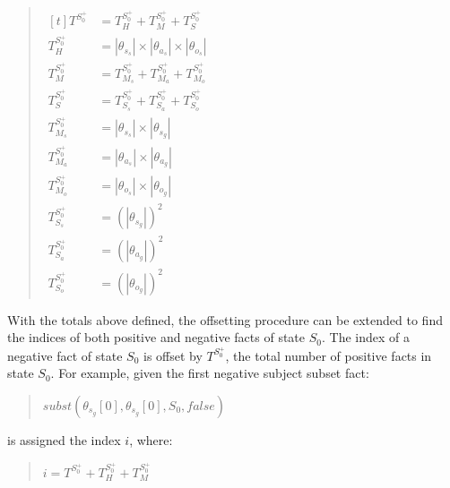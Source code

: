 \documentclass[10pt, twocolumn]{article}
\begin{document}
           \begin{quote}
            \begin{math}
              \begin{aligned}[t]
                T^{S^{+}_{0}} &= T^{S^{+}_{0}}_{H} + T^{S^{+}_{0}}_{M} + T^{S^{+}_{0}}_{S} \\
                T^{S^{+}_{0}}_{H} &= |{\theta}_{s_s}| \times |{\theta}_{a_s}| \times |{\theta}_{o_s}| \\
                T^{S^{+}_{0}}_{M} &= T^{S^{+}_{0}}_{M_s} + T^{S^{+}_{0}}_{M_a} + T^{S^{+}_{0}}_{M_o} \\
                T^{S^{+}_{0}}_{S} &= T^{S^{+}_{0}}_{S_s} + T^{S^{+}_{0}}_{S_a} + T^{S^{+}_{0}}_{S_o} \\
                T^{S^{+}_{0}}_{M_s} &= |{\theta}_{s_s}| \times |{\theta}_{s_g}| \\
                T^{S^{+}_{0}}_{M_a} &= |{\theta}_{a_s}| \times |{\theta}_{a_g}| \\
                T^{S^{+}_{0}}_{M_o} &= |{\theta}_{o_s}| \times |{\theta}_{o_g}| \\
                T^{S^{+}_{0}}_{S_s} &= (|{\theta}_{s_g}|)^{2} \\
                T^{S^{+}_{0}}_{S_a} &= (|{\theta}_{a_g}|)^{2} \\
                T^{S^{+}_{0}}_{S_o} &= (|{\theta}_{o_g}|)^{2}
              \end{aligned}
            \end{math}
          \end{quote}
   
          With the totals above defined, the offsetting procedure can be
          extended to find the indices of both positive and negative facts of
          state $S_{0}$. The index of a negative fact of state $S_{0}$ is
          offset by $T^{S^{+}_{0}}$, the total number of positive facts in
          state $S_{0}$. For example, given the first negative subject subset
          fact:

          \begin{quote}
            $subst({\theta}_{s_g}[0], {\theta}_{s_g}[0], S_{0}, false)$
          \end{quote}

          is assigned the index $i$, where:

          \begin{quote}
            \begin{math}
              i = T^{S^{+}_{0}} + T^{S^{+}_{0}}_{H} + T^{S^{+}_{0}}_{M} 
            \end{math}
          \end{quote}
\end{document}
